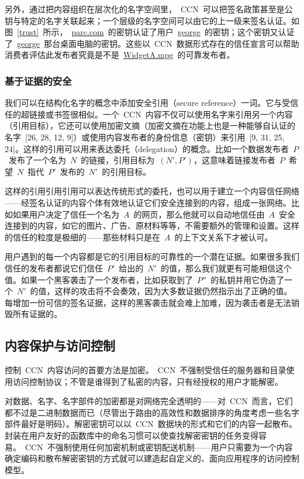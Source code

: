 另外，通过把内容组织在层次化的名字空间里，~CCN~可以把签名政策甚至是公钥与特定的名字关联起来；一个层级的名字空间可以由它的上一级来签名认证。如图~\ref{trust}~所示，~\url{parc.com}~的密钥认证了用户~\url{george}~的密钥；这个密钥又认证了~\url{george}~那台桌面电脑的密钥。这些以~CCN~数据形式存在的信任宣言可以帮助消费者评估此发布者究竟是不是~\url{WidgetA.mpg}~的可靠发布者。

\subsubsection{基于证据的安全}
\label{sec:5.2.2}
我们可以在结构化名字的概念中添加安全引用（secure reference）一词。它与受信任的超链接或书签很相似。一个~CCN~内容不仅可以使用名字来引用另一个内容（引用目标），它还可以使用加密文摘（加密文摘在功能上也是一种能够自认证的名字~[26, 28, 12, 9]）或使用内容发布者的身份信息（密钥）来引用~[9, 31, 25, 24]。这样的引用可以用来表达委托（delegation）的概念。比如一个数据发布者~$P$~发布了一个名为~$N$~的链接，引用目标为~$(N' , P')$，这意味着链接发布者~$P$~希望~$N$~指代~$P'$~发布的~$N'$~的引用目标。

这样的引用引用引用可以表达传统形式的委托，也可以用于建立一个内容信任网络——经签名认证的内容个体有效地认证它们安全连接到的内容，组成一张网络。比如如果用户决定了信任一个名为~$A$~的网页，那么他就可以自动地信任由~$A$~安全连接到的内容，如它的图片、广告、原材料等等，不需要额外的管理和设置。这样的信任的粒度是极细的——那些材料只是在~$A$~的上下文关系下才被认可。

用户遇到的每一个内容都是它的引用目标的可靠性的一个潜在证据。如果很多我们信任的发布者都说它们信任~$P'$~给出的~$N'$~的值，那么我们就更有可能相信这个值。如果一个黑客袭击了一个发布者，比如获取到了~$P''$~的私钥并用它伪造了一个~$N'$~的值，这样的攻击将不会奏效，因为大多数证据仍然指示出了正确的值。每增加一份可信的签名证据，这样的黑客袭击就会难上加难，因为袭击者是无法销毁所有证据的。

\subsection{内容保护与访问控制}
\label{sec:5.3}
控制~CCN~内容访问的首要方法是加密。~CCN~不强制受信任的服务器和目录使用访问控制协议；不管是谁得到了私密的内容，只有经授权的用户才能解密。

对数据、名字、名字部件的加密都是对网络完全透明的——对~CCN~而言，它们都不过是二进制数据而已（尽管出于路由的高效性和数据排序的角度考虑一些名字部件最好是明码）。解密密钥可以以~CCN~数据块的形式和它们的内容一起散布。封装在用户友好的函数库中的命名习惯可以使查找解密密钥的任务变得容易。~CCN~不强制使用任何加密机制或密钥配送机制——用户只需要为一个内容确定编码和散布解密密钥的方式就可以建造起自定义的、面向应用程序的访问控制模型。

